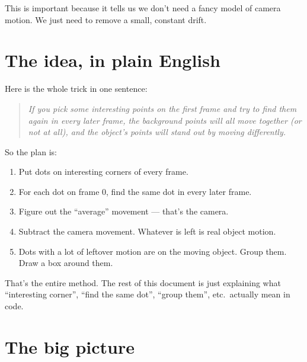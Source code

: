 \documentclass[11pt,a4paper]{article}
\begin{document}
This is important because it tells us we don't need a fancy model of
camera motion. We just need to remove a small, constant drift.

\section{The idea, in plain English}

Here is the whole trick in one sentence:

\begin{quote}
\emph{If you pick some interesting points on the first frame and try
to find them again in every later frame, the background points will
all move together (or not at all), and the object's points will
stand out by moving differently.}
\end{quote}

So the plan is:

\begin{enumerate}\itemsep2pt
\item Put dots on interesting corners of every frame.
\item For each dot on frame 0, find the same dot in every later
  frame.
\item Figure out the ``average'' movement --- that's the camera.
\item Subtract the camera movement. Whatever is left is real object
  motion.
\item Dots with a lot of leftover motion are on the moving object.
  Group them. Draw a box around them.
\end{enumerate}

That's the entire method. The rest of this document is just
explaining what ``interesting corner'', ``find the same dot'',
``group them'', etc.\ actually mean in code.

\section{The big picture}
\end{document}
